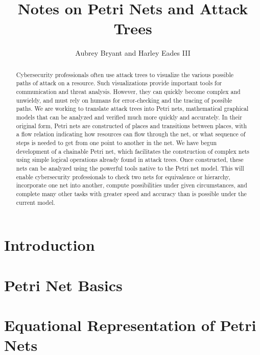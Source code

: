 \documentclass{article}
\title{Notes on Petri Nets and Attack Trees}
\author{Aubrey Bryant and Harley Eades III}
\begin{document}
\maketitle 

\begin{abstract}
  Cybersecurity professionals often use attack trees to visualize the various possible paths of attack on a resource. Such visualizations provide important tools for communication and threat analysis. However, they can quickly become complex and unwieldy, and must rely on humans for error-checking and the tracing of possible paths. We are working to translate attack trees into Petri nets, mathematical graphical models that can be analyzed and verified much more quickly and accurately. In their original form, Petri nets are constructed of places and transitions between places, with a flow relation indicating how resources can flow through the net, or what sequence of steps is needed to get from one point to another in the net. We have begun development of a chainable Petri net, which facilitates the construction of complex nets using simple logical operations already found in attack trees. Once constructed, these nets can be analyzed using the powerful tools native to the Petri net model. This will enable cybersecurity professionals to check two nets for equivalence or hierarchy, incorporate one net into another, compute possibilities under given circumstances, and complete many other tasks with greater speed and accuracy than is possible under the current model.
\end{abstract}
\section{Introduction}

\section{Petri Net Basics}

\section{Equational Representation of Petri Nets}


\nocite{*}


\end{document}
